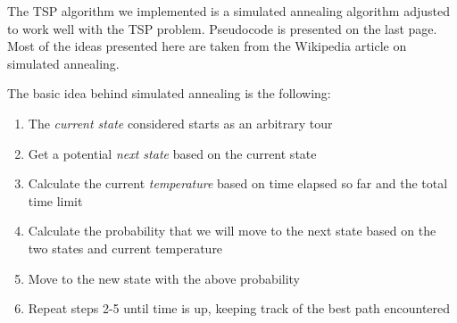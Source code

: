 \documentclass[11pt,letterpaper]{article}
\begin{document}
The TSP algorithm we implemented is a simulated annealing algorithm adjusted to work well with the TSP problem. Pseudocode is presented on the last page. Most of the ideas presented here are taken from the Wikipedia article on simulated annealing.

The basic idea behind simulated annealing is the following:
\begin{enumerate}
\item The \textit{current state} considered starts as an arbitrary tour
\item Get a potential \textit{next state} based on the current state 
\item Calculate the current \textit{temperature} based on time elapsed so far and the total time limit 
\item Calculate the probability that we will move to the next state based on the two states and current temperature
\item Move to the new state with the above probability
\item Repeat steps 2-5 until time is up, keeping track of the best path encountered
\end{enumerate}
\end{document}

